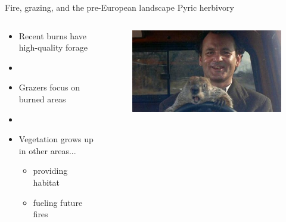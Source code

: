 \documentclass[11pt]{beamer}
\begin{document}
\begin{frame}{Fire, grazing, and the pre-European landscape}
\alert{Pyric herbivory}
\begin{columns}
\begin{column}{0.5\textwidth}
\begin{itemize}
	\item Recent burns have high-quality forage
	\item[]
	\item Grazers focus on burned areas
	\item[]
	\item Vegetation grows up in other areas...
		\begin{itemize}
			\item providing habitat
			\item fueling future fires
		\end{itemize}
	\end{itemize}
\end{column}
\begin{column}{0.55\textwidth}  
\begin{center}
\begin{figure}
 \includegraphics[width=1\linewidth]{figs/ghd} 
 
 \end{figure}
\end{center}
\end{column}
\end{columns}
\end{frame}
\end{document}
